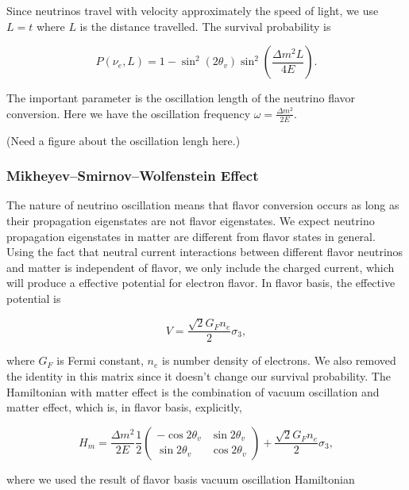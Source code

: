 \documentclass[%
 aip,
 jmp,%
 amsmath,amssymb,
 reprint,%
]{revtex4-1}
\begin{document}
Since neutrinos travel with velocity approximately the speed of light, we use $L = t$ where $L$ is the distance travelled. The survival probability is

\begin{equation}
P(\nu_e,L) =  1-\sin^2(2\theta_v)\sin^2\left( \frac{\Delta m^2 L}{4E} \right).
\end{equation}


The important parameter is the oscillation length of the neutrino flavor conversion. Here we have the oscillation frequency $\omega = \frac{\Delta m^2}{2E}$.

(Need a figure about the oscillation lengh here.)



\subsubsection{Mikheyev–Smirnov–Wolfenstein Effect}

The nature of neutrino oscillation means that flavor conversion occurs as long as their propagation eigenstates are not flavor eigenstates. We expect neutrino propagation eigenstates in matter are different from flavor states in general.\cite{wolf78} Using the fact that neutral current interactions between different flavor neutrinos and matter is independent of flavor, we only include the charged current, which will produce a effective potential for electron flavor. In flavor basis, the effective potential is

\begin{equation}
V=\frac{\sqrt{2}G_F n_e}{2} \sigma_3,
\end{equation}

where $G_F$ is Fermi constant, $n_e$ is number density of electrons. We also removed the identity in this matrix since it doesn't change our survival probability. The Hamiltonian with matter effect is the combination of vacuum oscillation and matter effect, which is, in flavor basis, explicitly,

\begin{equation}
H_m = \frac{ \Delta m^2 }{2E}\frac{1}{2}\begin{pmatrix} -\cos 2\theta_v & \sin 2 \theta_v \\ \sin 2\theta_v & \cos 2\theta_v  \end{pmatrix} + \frac{\sqrt{2}G_F n_e}{2} \sigma_3,
\end{equation}

where we used the result of flavor basis vacuum oscillation Hamiltonian
\end{document}

